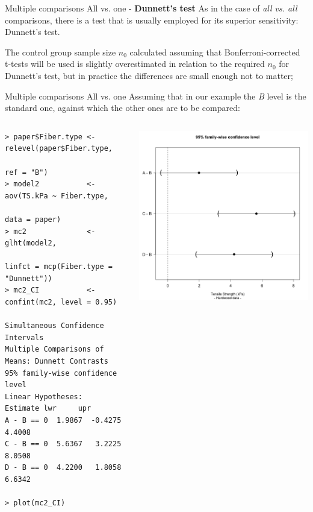 %
%
\begin{frame}
{Multiple comparisons}
{All vs. one - \textbf{Dunnett's test}}
As in the case of \textit{all vs. all} comparisons, there is a test that is usually employed for its superior sensitivity: Dunnett's test.\bigskip

The control group sample size $n_0$ calculated assuming that Bonferroni-corrected t-tests will be used is slightly overestimated in relation to the required $n_0$ for Dunnett's test, but in practice the differences are small enough not to matter;
\end{frame}
%
%
\begin{frame}[fragile]
{Multiple comparisons}
{All vs. one}
Assuming that in our example the \textit{B} level is the standard one, against which the other ones are to be compared:

\begin{columns}
  {\tiny
\begin{verbatim}
> paper$Fiber.type <- relevel(paper$Fiber.type,
                              ref = "B")
> model2           <- aov(TS.kPa ~ Fiber.type,
                          data = paper)
> mc2              <- glht(model2,
                       linfct = mcp(Fiber.type = "Dunnett"))
> mc2_CI           <- confint(mc2, level = 0.95)

Simultaneous Confidence Intervals
Multiple Comparisons of Means: Dunnett Contrasts
95% family-wise confidence level
Linear Hypotheses:
Estimate lwr     upr
A - B == 0  1.9867  -0.4275  4.4008
C - B == 0  5.6367   3.2225  8.0508
D - B == 0  4.2200   1.8058  6.6342

> plot(mc2_CI)
\end{verbatim}}
\includegraphics[width=1\textwidth]{../img/paperdunnett.png}
\end{columns}
\end{frame}
